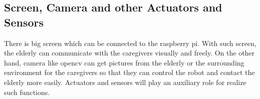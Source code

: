 \documentclass[12pt]{article}
\begin{document}
\subsection{Screen, Camera and other Actuators and Sensors}
There is big screen which can be connected to the raspberry pi. With such screen, the elderly can communicate with the caregivers visually and freely. On the other hand, camera like opencv can get pictures from the elderly or the surrounding environment for the caregivers so that they can control the robot and contact the elderly more easily. Actuators and sensors will play an auxiliary role for realize such functions.
   
\end{document}
